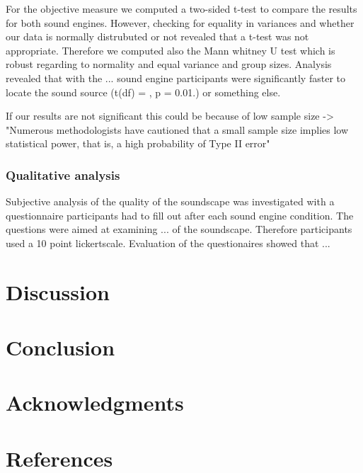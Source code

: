 \documentclass[journal]{IEEEtran}
\begin{document}
For the objective measure we computed a two-sided t-test to compare the results for both sound engines. However, checking for equality in variances and whether our data is normally distrubuted or not revealed that a t-test was not appropriate. Therefore we computed also the Mann whitney U test which is robust regarding to normality and equal variance and group sizes.  Analysis revealed that with the ... sound engine participants were significantly faster to locate the sound source (t(df) = , p = 0.01.) or something else. 

If our results are not significant this could be because of low sample size -> "Numerous methodologists have 
cautioned that a small sample size implies low statistical 
power, that is, a high probability of Type II error" \cite{DeWinter2013}

\subsubsection{Qualitative analysis}
 Subjective analysis of the quality of the soundscape was investigated with a questionnaire participants had to fill out after each sound engine condition. The questions were aimed at examining ... of the soundscape. Therefore participants used a 10 point lickertscale. Evaluation of the questionaires showed that ... 



\section{Discussion}


\section{Conclusion}




\section*{Acknowledgments}




\pagebreak
\section*{References}
\end{document}

